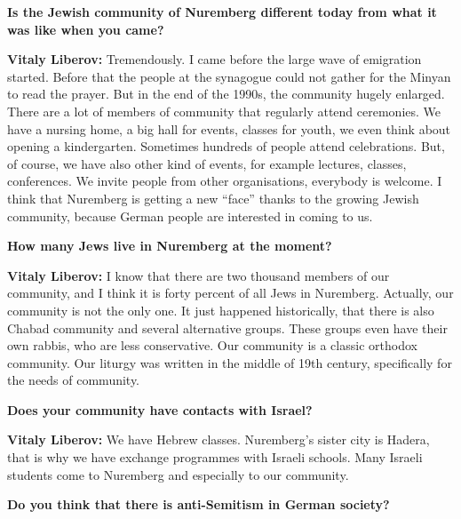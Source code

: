 \textbf{Is the Jewish community of Nuremberg different today from what it was like when you came?} 

\textbf{Vitaly Liberov:} Tremendously. I came before the large wave of emigration started. Before that the people at the synagogue could not gather for the Minyan to read the prayer. But in the end of the 1990s, the community hugely enlarged. There are a lot of members of community that regularly attend ceremonies. We have a nursing home, a big hall for events, classes for youth, we even think about opening a kindergarten. Sometimes hundreds of people attend celebrations.  But, of course, we have also other kind of events, for example lectures, classes, conferences. We invite people from other organisations, everybody is welcome. I think that Nuremberg is getting a new ``face'' thanks to the growing Jewish community, because German people are interested in coming to us.    

\textbf{How many Jews live in Nuremberg at the moment?} 

\textbf{Vitaly Liberov:} I know that there are two thousand members of our community, and I think it is forty percent of all Jews in Nuremberg. Actually, our community is not the only one. It just happened historically, that there is also Chabad community and several alternative groups. These groups even have their own rabbis, who are less conservative. Our community is a classic orthodox community. 
Our liturgy was written in the middle of 19th century, specifically for the needs of community.   

\textbf{Does your community have contacts with Israel?} 

\textbf{Vitaly Liberov:} We have Hebrew classes. Nuremberg’s sister city is Hadera, that is why we have exchange programmes with Israeli schools. Many Israeli students come to Nuremberg and especially to our community. 

\textbf{Do you think that there is anti-Semitism in German society?} 

